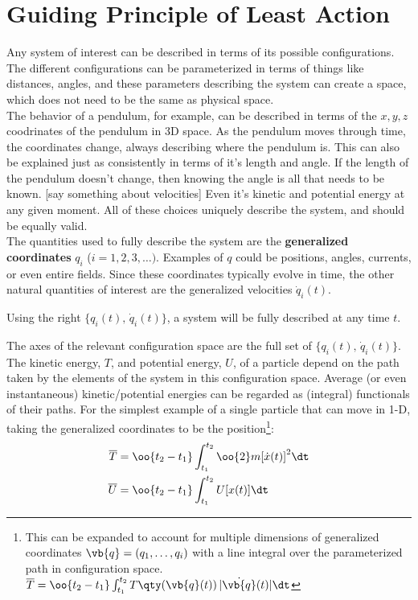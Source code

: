 \newpage\section{Guiding Principle of Least Action}
Any system of interest can be described in terms of its possible configurations. The different configurations can be parameterized in terms of things like distances, angles, and these parameters describing the system can create a space, which does not need to be the same as physical space. 
\\
The behavior of a pendulum, for example, can be described in terms of the \(x,y,z\) coodrinates of the pendulum in 3D space. As the pendulum moves through time, the coordinates change, always describing where the pendulum is. This can also be explained just as consistently in terms of it's length and angle. If the length of the pendulum doesn't change, then knowing the angle is all that needs to be known. [say something about velocities]
Even it's kinetic and potential energy at any given moment. All of these choices uniquely describe the system, and should be equally valid. 
\\
The quantities used to fully describe the system are the \textbf{generalized coordinates} \(q_i\) (\(i=1,2,3,\ldots)\). Examples of \(q\) could be positions, angles, currents, or even entire fields. Since these coordinates typically evolve in time, the other natural quantities of interest are the generalized velocities \(\dot{q}_i(t)\). 
\begin{center}
	Using the right \(\{q_i(t),\,\dot{q}_i(t)\}\), a system will be fully described at any time \(t\).
\end{center}
The axes of the relevant configuration space are the full set of \(\{q_i(t),\,\dot{q}_i(t)\}\).
The kinetic energy, \(T\), and potential energy, \(U\), of a particle depend on the path taken by the elements of the system in this configuration space.
Average (or even instantaneous) kinetic/potential energies can be regarded as (integral) functionals of their paths. For the simplest example of a single particle that can move in 1-D, taking the generalized coordinates to be the position\footnote{	
	This can be expanded to account for multiple dimensions of generalized coordinates \(\vb{q}=(q_1,\ldots,q_i)\) with a line integral over the parameterized path in configuration space.
	\(\overline{T}=\oo{t_2-t_1} \int_{t_1}^{t_2}T\qty(\vb{q}(t))\,|\dot{\vb{q}}(t)|\dt\)
}:
\begin{align*}
	\overline{T}&=\oo{t_2-t_1} \int_{t_1}^{t_2}\oo{2}m{[\dot{x}(t)]}^2 \dt
	\\
	\overline{U}&= \oo{t_2-t_1} \int_{t_1}^{t_2}U[{x(t)}] \dt
\end{align*}


